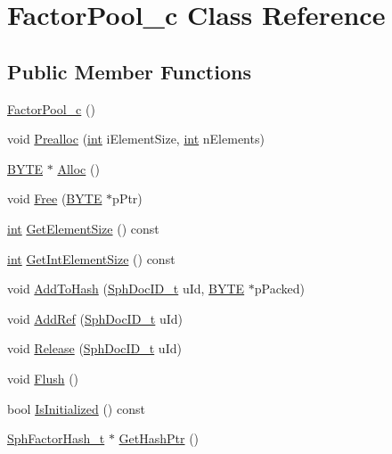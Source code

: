 \hypertarget{classFactorPool__c}{\section{Factor\-Pool\-\_\-c Class Reference}
\label{classFactorPool__c}
}
\subsection*{Public Member Functions}
\begin{DoxyCompactItemize}
\item 
\hyperlink{classFactorPool__c_ae1d42049bbad032c75345e124ab4333c}{Factor\-Pool\-\_\-c} ()
\item 
void \hyperlink{classFactorPool__c_a87bc60a396d053f18efc8445402ec36e}{Prealloc} (\hyperlink{sphinxexpr_8cpp_a4a26e8f9cb8b736e0c4cbf4d16de985e}{int} i\-Element\-Size, \hyperlink{sphinxexpr_8cpp_a4a26e8f9cb8b736e0c4cbf4d16de985e}{int} n\-Elements)
\item 
\hyperlink{sphinxstd_8h_a4ae1dab0fb4b072a66584546209e7d58}{B\-Y\-T\-E} $\ast$ \hyperlink{classFactorPool__c_a4bb0e82b7af4f7e5e9885a67a7b0a44c}{Alloc} ()
\item 
void \hyperlink{classFactorPool__c_a54c5b83f000ba9aa5b14ce33eff8baf2}{Free} (\hyperlink{sphinxstd_8h_a4ae1dab0fb4b072a66584546209e7d58}{B\-Y\-T\-E} $\ast$p\-Ptr)
\item 
\hyperlink{sphinxexpr_8cpp_a4a26e8f9cb8b736e0c4cbf4d16de985e}{int} \hyperlink{classFactorPool__c_ad934a7ea9eccfc156973558cb7873d00}{Get\-Element\-Size} () const 
\item 
\hyperlink{sphinxexpr_8cpp_a4a26e8f9cb8b736e0c4cbf4d16de985e}{int} \hyperlink{classFactorPool__c_aae281bd608966cdc825e4e997ceb71ea}{Get\-Int\-Element\-Size} () const 
\item 
void \hyperlink{classFactorPool__c_a444612ddb6cd3db7c6bae21b7d071362}{Add\-To\-Hash} (\hyperlink{sphinx_8h_a3176771631c12a9e4897272003e6b447}{Sph\-Doc\-I\-D\-\_\-t} u\-Id, \hyperlink{sphinxstd_8h_a4ae1dab0fb4b072a66584546209e7d58}{B\-Y\-T\-E} $\ast$p\-Packed)
\item 
void \hyperlink{classFactorPool__c_a9890a2b146eeb700d378b7958916ce55}{Add\-Ref} (\hyperlink{sphinx_8h_a3176771631c12a9e4897272003e6b447}{Sph\-Doc\-I\-D\-\_\-t} u\-Id)
\item 
void \hyperlink{classFactorPool__c_aca0e9bfd2578fc4309c810af17c1adcd}{Release} (\hyperlink{sphinx_8h_a3176771631c12a9e4897272003e6b447}{Sph\-Doc\-I\-D\-\_\-t} u\-Id)
\item 
void \hyperlink{classFactorPool__c_a71715faa95d755ff7e2d3cd704672a9c}{Flush} ()
\item 
bool \hyperlink{classFactorPool__c_a78f748f0589a385553a43241e1effc5f}{Is\-Initialized} () const 
\item 
\hyperlink{sphinxint_8h_ad10cf8fddc53077dfb9d731819db9ec0}{Sph\-Factor\-Hash\-\_\-t} $\ast$ \hyperlink{classFactorPool__c_a1780c44f5f3042fb00019f04987ba65d}{Get\-Hash\-Ptr} ()
\end{DoxyCompactItemize}
